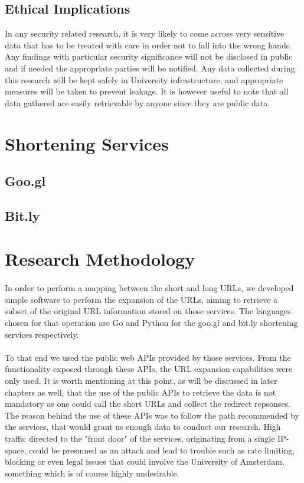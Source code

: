 \documentclass[12pt]{article}
\begin{document}
\subsection{Ethical Implications}
In any security related research, it is very likely to come across very sensitive data that has to be treated with care in order not to fall into the wrong hands. Any findings with particular security significance will not be disclosed in public and if needed the appropriate parties will be notified. Any data collected during this research will be kept safely in University infrastructure, and appropriate measures will be taken to prevent leakage. It is however useful to note that all data gathered are easily retrievable by anyone since they are public data.
\newpage
\section{Shortening Services}

\subsection{Goo.gl}

\subsection{Bit.ly}
	
\section{Research Methodology}

\paragraph{}
In order to perform a mapping between the short and long URLs, we developed simple software to perform the expansion of the URLs, aiming to retrieve a subset of the original URL information stored on those services. The languages chosen for that operation are Go and Python for the goo.gl and bit.ly shortening services respectively. 

\paragraph{}
To that end we used the public web APIs provided by those services. From the functionality exposed through these APIs, the URL expansion capabilities were only used. It is worth mentioning at this point, as will be discussed in later chapters as well, that the use of the public APIs to retrieve the data is not mandatory as one could call the short URLs and collect the redirect repsonses. The reason behind the use of these APIs was to follow the path recommended by the services, that would grant us enough data to conduct our research. High traffic directed to the "front door" of the services, originating from a single IP-space, could be presumed as an attack and lead to trouble such as rate limiting, blocking or even legal issues that could involve the University of Amsterdam, something which is of course highly undesirable. 
\end{document}
